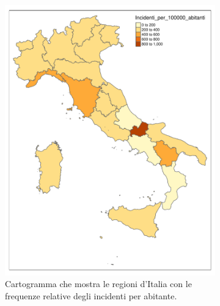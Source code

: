 \documentclass[12pt,a4paper,final,oneside]{article}			%
\begin{document}
        \begin{figure}[h]
            \begin{subfigure}{0.4\textwidth}
                \centering
                \includegraphics[scale=0.4]{../results/incidenti_per_100000_abitanti.pdf}
                \caption{Cartogramma che mostra le regioni d’Italia con le frequenze relative degli incidenti per abitante.}
                \label{Fig: mappa_incidenti_regioni_per_abitanti}
            \end{subfigure}
            \hfill
            \begin{subfigure}{0.4\textwidth}
                \centering

\end{subfigure}
\end{figure}
\end{document}
